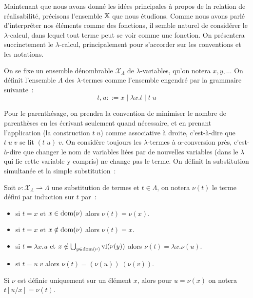 \documentclass{article}
\begin{document}
Maintenant que nous avons donné les idées principales à propos de la relation de réalisabilité, précisons l'ensemble $\mathbb X$ que nous étudions. Comme nous avons parlé d'interpréter nos éléments comme des fonctions, il semble naturel de considérer le $\lambda$-calcul, dans lequel tout terme peut se voir comme une fonction. On présentera succinctement le $\lambda$-calcul, principalement pour s'accorder sur les conventions et les notations.

\begin{defi}\label{def.lam}
    On se fixe un ensemble dénombrable $\mathcal X_\Lambda$ de $\lambda$-variables, qu'on notera $x,y,\ldots$ On définit l'ensemble $\Lambda$ des $\lambda$-termes comme l'ensemble engendré par la grammaire suivante~:
    \[t,u ::= x \mid \lambda x. t\mid t\;u\]
\end{defi}

Pour le parenthésage, on prendra la convention de minimiser le nombre de parenthèses en les écrivant seulement quand nécessaire, et en prenant l'application (la construction $t\;u$) comme associative à droite, c'est-à-dire que $t\;u\;v$ se lit $(t\;u)\;v$. On considère toujours les $\lambda$-termes à $\alpha$-conversion près, c'est-à-dire que changer le nom de variables liées par de nouvelles variables (dans le $\lambda$ qui lie cette variable y compris) ne change pas le terme. On définit la substitution simultanée et la simple substitution~:

\begin{defi}
    Soit $\nu : \mathcal X_\Lambda \rightharpoonup \Lambda$ une substitution de termes et $t\in \Lambda$, on notera $\nu(t)$ le terme défini par induction sur $t$ par~:
    \begin{itemize}
        \item si $t = x$ et $x \in \mathrm{dom}(\nu)$ alors $\nu(t) = \nu(x)$.
        \item si $t = x$ et $x\notin\mathrm{dom}(\nu)$ alors $\nu(t) = x$.
        \item si $t = \lambda x.u$ et $x\notin\bigcup_{y\in\mathrm{dom}(\nu)}\mathrm{vl}(\nu(y))$ alors $\nu(t) = \lambda x.\nu(u)$.
        \item si $t = u\;v$ alors $\nu(t) = (\nu(u))\;(\nu(v))$.
    \end{itemize}

    Si $\nu$ est définie uniquement sur un élément $x$, alors pour $u = \nu(x)$ on notera $t[u/x] = \nu(t)$.
\end{defi}
\end{document}
